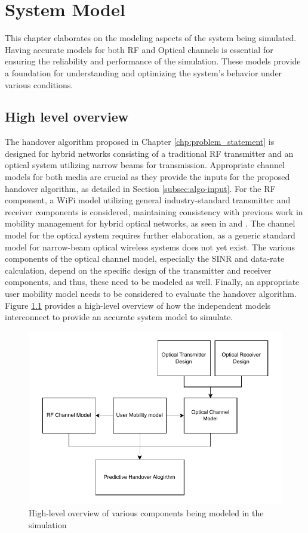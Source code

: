 \chapter{System Model}
\label{chp:system-model}
This chapter elaborates on the modeling aspects of the system being simulated. Having accurate models for both RF and Optical channels is essential for ensuring the reliability and performance of the simulation. These models provide a foundation for understanding and optimizing the system's behavior under various conditions.
\section{High level overview}
The handover algorithm proposed in Chapter \ref{chp:problem_statement} is designed for hybrid networks consisting of a traditional RF transmitter and an optical system utilizing narrow beams for transmission. Appropriate channel models for both media are crucial as they provide the inputs for the proposed handover algorithm, as detailed in Section \ref{subsec:algo-input}. For the RF component, a WiFi model utilizing general industry-standard transmitter and receiver components is considered, maintaining consistency with previous work in mobility management for hybrid optical networks, as seen in \cite{wu_novel_2020} and \cite{wu_smart_2020}. The channel model for the optical system requires further elaboration, as a generic standard model for narrow-beam optical wireless systems does not yet exist. The various components of the optical channel model, especially the SINR and data-rate calculation, depend on the specific design of the transmitter and receiver components, and thus, these need to be modeled as well. Finally, an appropriate user mobility model needs to be considered to evaluate the handover algorithm. Figure \ref{fig:mod-high-level} provides a high-level overview of how the independent models interconnect to provide an accurate system model to simulate.
\begin{figure}
    \centering
    \includegraphics[width=0.75\linewidth]{Figures/modeling-high-level.drawio.pdf}
    \caption{High-level overview of various components being modeled in the simulation}
    \label{fig:mod-high-level}
\end{figure}
